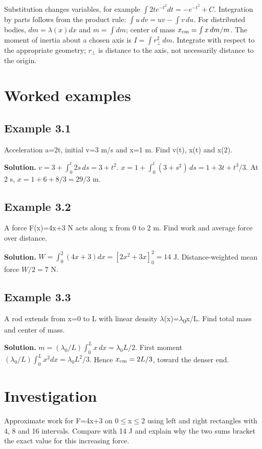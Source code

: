 \documentclass[11pt,a4paper,openany]{book}
\begin{document}
Substitution changes variables, for example $\int 2t e^{-t^2}dt=-e^{-t^2}+C$. Integration by parts follows from the product rule: $\int u\,dv=uv-\int v\,du$. For distributed bodies, $dm=\lambda(x)dx$ and $m=\int dm$; center of mass $x_{\rm cm}=\int x\,dm/m$. The moment of inertia about a chosen axis is $I=\int r_\perp^2\,dm$. Integrate with respect to the appropriate geometry; $r_\perp$ is distance to the axis, not necessarily distance to the origin.
\begin{center}
\end{center}
\section{Worked examples}
\subsection*{Example 3.1}
Acceleration a=2t, initial v=3 m/s and x=1 m. Find v(t), x(t) and x(2).

\textbf{Solution.} $v=3+\int_0^t2s\,ds=3+t^2$. $x=1+\int_0^t(3+s^2)\,ds=1+3t+t^3/3$. At 2 s, $x=1+6+8/3=29/3$ m.
\subsection*{Example 3.2}
A force F(x)=4x+3 N acts along x from 0 to 2 m. Find work and average force over distance.

\textbf{Solution.} $W=\int_0^2(4x+3)dx=[2x^2+3x]_0^2=14$ J. Distance-weighted mean force $W/2=7$ N.
\subsection*{Example 3.3}
A rod extends from x=0 to L with linear density \ensuremath{\lambda}(x)=\ensuremath{\lambda}\textsubscript{0}x/L. Find total mass and center of mass.

\textbf{Solution.} $m=(\lambda_0/L)\int_0^L x\,dx=\lambda_0L/2$. First moment $(\lambda_0/L)\int_0^Lx^2dx=\lambda_0L^2/3$. Hence $x_{\rm cm}=2L/3$, toward the denser end.
\section{Investigation}
Approximate work for F=4x+3 on 0\ensuremath{\le}x\ensuremath{\le}2 using left and right rectangles with 4, 8 and 16 intervals. Compare with 14 J and explain why the two sums bracket the exact value for this increasing force.
\end{document}
